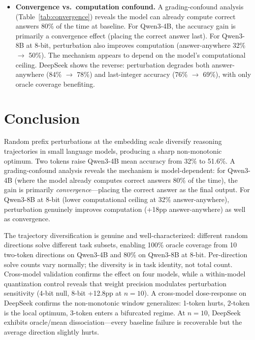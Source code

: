 \documentclass{article}
\begin{document}
\begin{itemize}
    \item \textbf{Convergence vs.\ computation confound.}
    A grading-confound analysis (Table~\ref{tab:convergence}) reveals
    the model can already compute correct answers 80\% of the time
    at baseline. For Qwen3-4B, the accuracy gain is primarily a
    convergence effect (placing the correct answer last). For
    Qwen3-8B at 8-bit, perturbation also improves computation
    (answer-anywhere 32\% $\to$ 50\%). The mechanism appears to
    depend on the model's computational ceiling.
    DeepSeek shows the reverse: perturbation degrades both
    answer-anywhere (84\% $\to$ 78\%) and last-integer accuracy
    (76\% $\to$ 69\%), with only oracle coverage benefiting.
\end{itemize}

\section{Conclusion}

Random prefix perturbations at the embedding scale diversify reasoning
trajectories in small language models, producing a sharp non-monotonic
optimum. Two tokens raise Qwen3-4B mean accuracy from 32\% to 51.6\%.
A grading-confound analysis reveals the mechanism is model-dependent:
for Qwen3-4B (where the model already computes correct answers 80\%
of the time), the gain is primarily \emph{convergence}---placing the
correct answer as the final output. For Qwen3-8B at 8-bit (lower
computational ceiling at 32\% answer-anywhere), perturbation genuinely
improves computation (+18pp answer-anywhere) as well as convergence.

The trajectory diversification is genuine and well-characterized:
different random directions solve different task subsets, enabling
100\% oracle coverage from 10 two-token directions on Qwen3-4B and
80\% on Qwen3-8B at 8-bit. Per-direction solve counts vary normally;
the diversity is in task identity, not total count.
Cross-model validation confirms the effect on four models, while
a within-model quantization control reveals that weight precision
modulates perturbation sensitivity (4-bit null, 8-bit +12.8pp at
$n{=}10$). A cross-model dose-response on DeepSeek confirms the
non-monotonic window generalizes: 1-token hurts, 2-token is the
local optimum, 3-token enters a bifurcated regime. At $n{=}10$,
DeepSeek exhibits oracle/mean dissociation---every baseline failure
is recoverable but the average direction slightly hurts.
\end{document}
